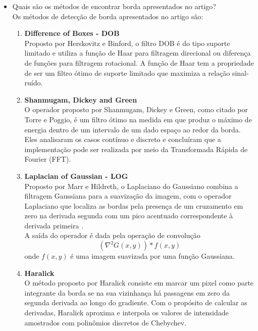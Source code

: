 \documentclass[12pt]{article}
\begin{document}
\begin{itemize}
\begin{itemize}
\item Quais são os métodos de encontrar borda apresentados no artigo?
\\Os métodos de detecção de borda apresentados no artigo são:
\begin{enumerate}[label*=\arabic*.]
    \item \textbf{Difference of Boxes - DOB}\\
    Proposto por Herskovitz e Binford, o filtro DOB é do tipo suporte limitado e utiliza a função de Haar para filtragem direcional
    ou diferença de funções para filtragem rotacional.
    A função de Haar tem a propriedade de ser um filtro ótimo de suporte limitado que maximiza a relação sinal-ruído.
    \\
    \item \textbf{Shanmugam, Dickey and Green}\\
    O operador proposto por Shanmugam, Dickey e Green, como citado por Torre e Poggio, é um filtro ótimo na medida em que produz o máximo de energia dentro de um intervalo de um dado espaço ao redor da borda. Eles analisaram os casos contínuo e discreto e concluíram que a implementação pode ser realizada por meio da Transformada Rápida de Fourier (FFT).
    \\
    \item \textbf{Laplacian of Gaussian - LOG}\\
    Proposto por Marr e Hildreth, o Laplaciano do Gaussiano combina a filtragem Gaussiana para a suavização da imagem, com o operador Laplaciano
    que localiza as bordas pela presença de um cruzamento em zero na derivada segunda com um pico acentuado correspondente à derivada primeira \cite{pedrini2008analise}.\\
    A saída do operador é dada pela operação de convolução
    \begin{equation} \label{eq:log}
        (\nabla^2 G(x, y)) * f(x, y)
    \end{equation}
    onde $f(x, y)$ é uma imagem suavizada por uma função Gaussiana.
    \\
    \item \textbf{Haralick}\\
    O método proposto por Haralick consiste em marcar um pixel como parte integrante da borda se na sua vizinhança há passagens em zero da segunda derivada ao longo do gradiente. Com o propósito de calcular as derivadas, Haralick aproxima e interpola os valores de intensidade amostrados com polinômios discretos de Chebychev.
    \\

\end{enumerate}
\end{itemize}
\end{itemize}
\end{document}
